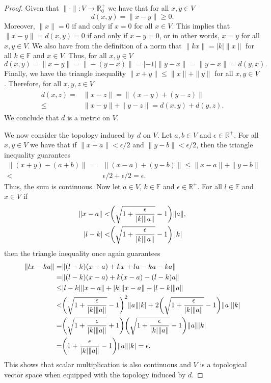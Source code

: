 \begin{proof}
	Given that $\|\cdot\|:V\rightarrow\mathbb{R}^+_0$ we have that for all $x,y\in V$ 
	\begin{equation}
		d(x,y)=\|x-y\|\geq 0.
	\end{equation}
Moreover, $\|x\|=0$ if and only if $x=0$ for all $x\in V$. This implies that $\|x-y\|=d(x,y)=0$ if and only if $x-y=0$, or in other words, $x=y$ for all $x,y\in V$. We also have from the definition of a norm that $\|kx\|=|k|\|x\|$ for all $k\in\mathbb{F}$ and $x\in V$. Thus, for all $x,y\in V$
	\begin{equation}
		d(x,y)=\|x-y\|=\|-(y-x)\|=|-1|\|y-x\|=\|y-x\|=d(y,x).
	\end{equation}
Finally, we have the triangle inequality $\|x+y\|\leq\|x\|+\|y\|$ for all $x,y\in V$. Therefore, for all $x,y,z\in V$
	\begin{align}
	\begin{split}
		d(x,z)=&\|x-z\|=\|(x-y)+(y-z)\|\\
		\leq&\|x-y\|+\|y-z\|=d(x,y)+d(y,z).
	\end{split}
	\end{align}
We conclude that $d$ is a metric on $V$.

	We now consider the topology induced by $d$ on $V$. Let $a,b\in V$ and $\epsilon\in\mathbb{R}^+$. For all $x,y\in V$ we have that if $\|x-a\|<\epsilon/2$ and $\|y-b\|<\epsilon/2$, then the triangle inequality guarantees
	\begin{align}
		\|(x+y)-(a+b)\|=&\|(x-a)+(y-b)\|\leq\|x-a\|+\|y-b\|\\
		<&\epsilon/2+\epsilon/2=\epsilon.
	\end{align}
Thus, the sum is continuous. Now let $a\in V$, $k\in\mathbb{F}$ and $\epsilon\in\mathbb{R}^+$. For all $l\in\mathbb{F}$ and $x\in V$ if 
	\begin{align}
	\begin{split}
		\|x-a\|<&\qty(\sqrt{1+\frac{\epsilon}{|k|\|a\|}}-1)\|a\|,\\
		|l-k|<&\qty(\sqrt{1+\frac{\epsilon}{|k|\|a\|}}-1)|k|
	\end{split}
	\end{align}
then the triangle inequality once again guarantees
	\begin{align}
	\begin{split}
		\|lx-ka\|=&\|(l-k)(x-a)+kx+la-ka-ka\|\\
		=&\|(l-k)(x-a)+k(x-a)-(l-k)a\|\\
		\leq&|l-k|\|x-a\|+|k|\|x-a\|+|l-k|\|a\|\\
		<&\qty(\sqrt{1+\frac{\epsilon}{|k|\|a\|}}-1)^2\|a\||k|+2\qty(\sqrt{1+\frac{\epsilon}{|k|\|a\|}}-1)\|a\||k|\\
		=&\qty(\sqrt{1+\frac{\epsilon}{|k|\|a\|}}+1)\qty(\sqrt{1+\frac{\epsilon}{|k|\|a\|}}-1)\|a\||k|\\
		=&\qty(1+\frac{\epsilon}{|k|\|a\|}-1)\|a\||k|=\epsilon.
	\end{split}
	\end{align}
This shows that scalar multiplication is also continuous and $V$ is a topological vector space when equipped with the topology induced by $d$. 
\end{proof}

